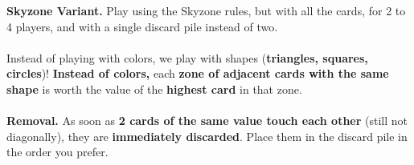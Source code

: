 \documentclass[a4paper]{memoir}
\begin{document}
{\footnotesize

\noindent 
\textbf{ Skyzone Variant.} 
Play using the Skyzone rules, but with all the cards, for 2 to 4 players, and with a single discard pile instead of two.
\\
\\
\noindent
{} Instead of playing with colors, we play with shapes (\textbf{triangles, squares, circles})!  
\textbf{Instead of colors,} each \textbf{zone of adjacent cards with the same shape} is worth the value of the \textbf{highest card} in that zone.
\\
\\
\noindent
\textbf{ Removal.} 
As soon as \textbf{2 cards of the same value touch each other} (still not diagonally), they are \textbf{immediately discarded}.  
Place them in the discard pile in the order you prefer.
}
\end{document}
